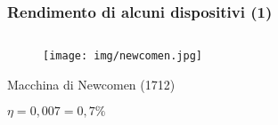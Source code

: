 \documentclass[]{beamer}
\theoremstyle{plain}
\begin{document}
\begin{frame}
  \frametitle{Rendimento di alcuni dispositivi (1)}
  \begin{columns}
    \begin{column}{0.3\textwidth}
      \begin{figure}
        \texttt{[image: img/newcomen.jpg]}
      \end{figure}
      Macchina di Newcomen (1712)
      
      $ \eta = 0,007 = 0,7 \% $
    \end{column}
    \begin{column}{0.3\textwidth}
    \end{column}
    \begin{column}{0.3\textwidth}
    \end{column}

  \end{columns}
\end{frame}
\end{document}
